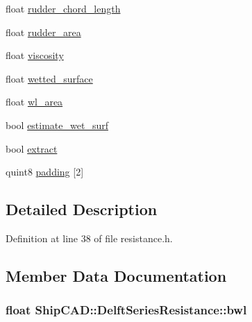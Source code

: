 \begin{DoxyCompactItemize}
\item 
float \hyperlink{structShipCAD_1_1DelftSeriesResistance_a5a348a92e0ba99368c50f72c81a9b0ff}{rudder\-\_\-chord\-\_\-length}
\item 
float \hyperlink{structShipCAD_1_1DelftSeriesResistance_a9737974d43a292c58a2e24f7c78c1ffb}{rudder\-\_\-area}
\item 
float \hyperlink{structShipCAD_1_1DelftSeriesResistance_a08ff900d51b56d7e1726cb4b5a6ffa9b}{viscosity}
\item 
float \hyperlink{structShipCAD_1_1DelftSeriesResistance_a7ee0a7e2d05634beb7fb9951d80c7557}{wetted\-\_\-surface}
\item 
float \hyperlink{structShipCAD_1_1DelftSeriesResistance_af51e72b70af1ce87cf7ac641df93c541}{wl\-\_\-area}
\item 
bool \hyperlink{structShipCAD_1_1DelftSeriesResistance_a0507b03a9329185d961cd97739237d91}{estimate\-\_\-wet\-\_\-surf}
\item 
bool \hyperlink{structShipCAD_1_1DelftSeriesResistance_a8276aa04952e727f1a310f10ceb72414}{extract}
\item 
quint8 \hyperlink{structShipCAD_1_1DelftSeriesResistance_acd08ff15cfab748bf4f54aa65b927950}{padding} \mbox{[}2\mbox{]}
\end{DoxyCompactItemize}


\subsection{Detailed Description}


Definition at line 38 of file resistance.\-h.



\subsection{Member Data Documentation}
\hypertarget{structShipCAD_1_1DelftSeriesResistance_a160c7b99be523bcda5301231806af6b3}{
\subsubsection[{bwl}]{\setlength{\rightskip}{0pt plus 5cm}float Ship\-C\-A\-D\-::\-Delft\-Series\-Resistance\-::bwl}}\label{structShipCAD_1_1DelftSeriesResistance_a160c7b99be523bcda5301231806af6b3}


